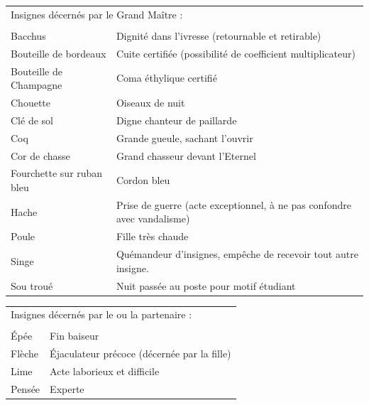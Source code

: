 \begin{center}
\begin{tabularx}{\textwidth}{X X}
\multicolumn{2}{l}{Insignes décernés par le Grand Maître :}\\
\\
Bacchus                   & Dignité dans l'ivresse (retournable et retirable)\\
Bouteille de bordeaux     & Cuite certifiée (possibilité de coefficient
                            multiplicateur)\\
Bouteille de Champagne    & Coma éthylique certifié\\
Chouette                  & Oiseaux de nuit\\
Clé de sol                & Digne chanteur de paillarde\\
Coq                       & Grande gueule, sachant l'ouvrir\\
Cor de chasse             & Grand chasseur devant l'Eternel\\
Fourchette sur ruban bleu & Cordon bleu\\
Hache                     & Prise de guerre (acte exceptionnel, à
                            ne pas confondre avec vandalisme)\\
Poule                     & Fille très chaude\\ %
Singe                     & Quémandeur d'insignes, empêche
                            de recevoir tout autre insigne.\\
Sou troué                 & Nuit passée au poste pour motif étudiant\\

\end{tabularx}
\end{center}

\begin{center}
\begin{tabularx}{\textwidth}{X X}

\\
\multicolumn{2}{l}{Insignes décernés par le ou la partenaire :}\\
\\
Épée        & Fin baiseur\\
Flèche      & Éjaculateur précoce (décernée par la fille)\\
Lime        & Acte laborieux et difficile\\
Pensée      & Experte\\

\end{tabularx}
\end{center}

